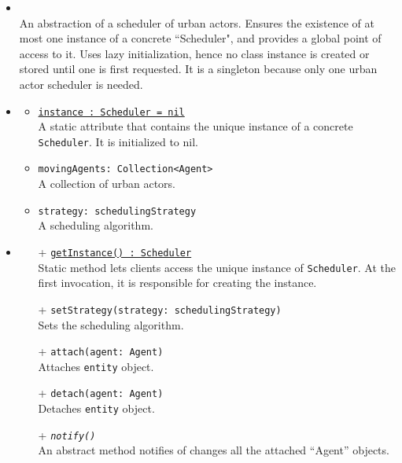 \begin{itemize}
  \item \textbf{\descr} \\
  An abstraction of a scheduler of urban actors.
  Ensures the existence of at most one instance of a concrete ``Scheduler", 
  and provides a global point of access to it.
  Uses lazy initialization, hence no class instance is created 
  or stored until one is first requested.
  It is a singleton because only one urban actor scheduler is needed.
  \item \textbf{\attrs}
  \begin{itemize}
    \item \texttt{\underline{instance : Scheduler = nil}} \\
    A static attribute that contains the unique instance 
    of a concrete \texttt{Scheduler}. It is initialized to nil.
    \item \texttt{movingAgents: Collection<Agent>} \\
	A collection of urban actors.
	\item \texttt{strategy: schedulingStrategy} \\
	A scheduling algorithm.
  \end{itemize}
  \item \textbf{\ops}
  \begin{itemize}
    \item[+] \texttt{\underline{getInstance() : Scheduler}} \\
    Static method lets clients access the unique instance 
    of \texttt{Scheduler}. At the first invocation, it is responsible 
    for creating the instance.
    \item[+] \texttt{setStrategy(strategy: schedulingStrategy)} \\
    Sets the scheduling algorithm.
    \item[+] \texttt{attach(agent: Agent)} \\
    Attaches \texttt{entity} object.
	\item[+] \texttt{detach(agent: Agent)} \\
	Detaches \texttt{entity} object.
	\item[+] \texttt{\textit{notify()}} \\
	An abstract method notifies of changes all the attached ``Agent'' objects.
  \end{itemize}
\end{itemize}

